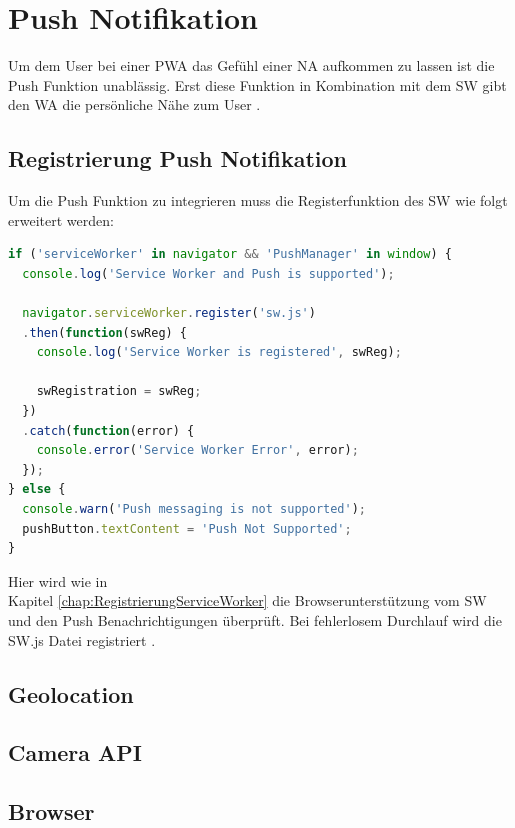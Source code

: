 \section{Push Notifikation}
Um dem User bei einer \acs{PWA} das Gefühl einer \acl{NA} aufkommen zu lassen ist die Push Funktion unablässig. Erst diese Funktion in Kombination mit dem \acs{SW} gibt den \acl{WA} die persönliche Nähe zum User \cite{PushNotifikation}.



\subsection{Registrierung Push Notifikation}
Um die Push Funktion zu integrieren muss die Registerfunktion des \acs{SW} wie folgt erweitert werden:
 
\begin{lstlisting}[language=JavaScript, caption={Push Notifications},label=lst:PushNotifikation, xleftmargin=50pt]
if ('serviceWorker' in navigator && 'PushManager' in window) {
  console.log('Service Worker and Push is supported');

  navigator.serviceWorker.register('sw.js')
  .then(function(swReg) {
    console.log('Service Worker is registered', swReg);

    swRegistration = swReg;
  })
  .catch(function(error) {
    console.error('Service Worker Error', error);
  });
} else {
  console.warn('Push messaging is not supported');
  pushButton.textContent = 'Push Not Supported';
}
\end{lstlisting}

Hier wird wie in \\ Kapitel \ref{chap:RegistrierungServiceWorker} die Browserunterstützung vom \acs{SW} und den Push Benachrichtigungen überprüft. Bei fehlerlosem Durchlauf wird die \acs{SW}.js Datei registriert \cite{PushNotifikation}.

\newpage



\subsection{Geolocation}


\subsection{Camera API}


\subsection{Browser} 





